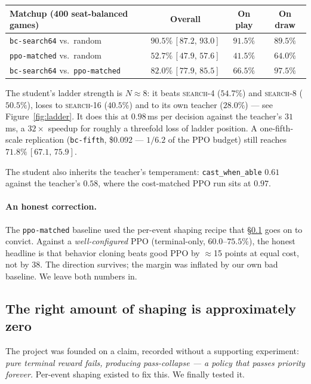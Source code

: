 \documentclass[11pt]{article}
\newcommand{\searchn}[1]{\textsc{search}-#1}
\newcommand{\ci}[2]{\,[#1,\,#2]}
\begin{document}
\begin{center}\small
\begin{tabular}{lccc}
\toprule
Matchup (400 seat-balanced games) & Overall & On play & On draw \\
\midrule
\texttt{bc-search64} vs.\ random        & $\mathbf{90.5\%}\ci{87.2}{93.0}$ & $91.5\%$ & $89.5\%$ \\
\texttt{ppo-matched} vs.\ random        & $52.7\%\ci{47.9}{57.6}$ & $41.5\%$ & $64.0\%$ \\
\texttt{bc-search64} vs.\ \texttt{ppo-matched} & $\mathbf{82.0\%}\ci{77.9}{85.5}$ & $66.5\%$ & $97.5\%$ \\
\bottomrule
\end{tabular}
\end{center}

The student's ladder strength is $N\approx8$: it beats \searchn{4} ($54.7\%$) and \searchn{8} ($50.5\%$), loses to \searchn{16} ($40.5\%$) and to its own teacher ($28.0\%$) --- see Figure~\ref{fig:ladder}. It does this at $0.98$\,ms per decision against the teacher's $31$\,ms, a $32\times$ speedup for roughly a threefold loss of ladder position. A one-fifth-scale replication (\texttt{bc-fifth}, \$0.092 --- $1/6.2$ of the PPO budget) still reaches $71.8\%\ci{67.1}{75.9}$.

The student also inherits the teacher's temperament: \texttt{cast\_when\_able} $0.61$ against the teacher's $0.58$, where the cost-matched PPO run sits at $0.97$.

\paragraph{An honest correction.} The \texttt{ppo-matched} baseline used the per-event shaping recipe that \S\ref{sec:shaping} goes on to convict. Against a \emph{well-configured} PPO (terminal-only, $60.0$--$75.5\%$), the honest headline is that behavior cloning beats good PPO by $\approx$15 points at equal cost, not by 38. The direction survives; the margin was inflated by our own bad baseline. We leave both numbers in.

\subsection{The right amount of shaping is approximately zero}
\label{sec:shaping}

The project was founded on a claim, recorded without a supporting experiment: \emph{pure terminal reward fails, producing pass-collapse --- a policy that passes priority forever.} Per-event shaping existed to fix this. We finally tested it.
\end{document}
